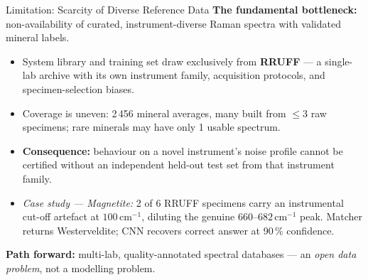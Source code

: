 \documentclass[aspectratio=169,10pt]{beamer}
\begin{document}
\begin{frame}{Limitation: Scarcity of Diverse Reference Data}
  {\small\bfseries\color{headerbg}The fundamental bottleneck:}
  non-availability of curated, instrument-diverse Raman spectra
  with validated mineral labels.

  \vspace{0.14cm}
  \begin{itemize}\setlength\itemsep{0.13cm}\small
    \item System library and training set draw exclusively from
          \textbf{RRUFF} --- a single-lab archive with its own instrument
          family, acquisition protocols, and specimen-selection biases.
    \item Coverage is uneven: 2\,456 mineral averages, many built from
          $\le3$ raw specimens; rare minerals may have only 1 usable spectrum.
    \item \textbf{Consequence:} behaviour on a novel instrument's noise
          profile cannot be certified without an independent held-out test
          set from that instrument family.
    \item \textit{Case study --- Magnetite:} 2 of 6 RRUFF specimens carry an
          instrumental cut-off artefact at $100\,\text{cm}^{-1}$, diluting
          the genuine $660$--$682\,\text{cm}^{-1}$ peak.
          Matcher returns Westerveldite; CNN recovers correct answer at
          90\,\% confidence.
  \end{itemize}

  \vspace{0.18cm}
  \begin{tcolorbox}[mathbox]
    \small\textbf{Path forward:} multi-lab, quality-annotated spectral
    databases --- an \emph{open data problem}, not a modelling problem.
  \end{tcolorbox}
\end{frame}
\end{document}
